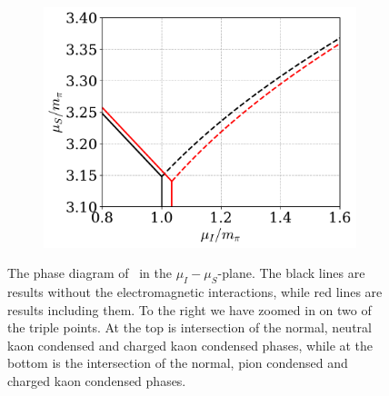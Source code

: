 \begin{figure}[!htb]
\begin{subfigure}{0.49\textwidth}
        \includegraphics[width=\textwidth]{../scripts/figurer/phase_diagram_EM2.pdf}
    \end{subfigure}
    \caption{
        The phase diagram of \chpt\ in the $\mu_I-\mu_S$-plane.
        The black lines are results without the electromagnetic interactions, while red lines are results including them. 
        To the right we have zoomed in on two of the triple points.
        At the top is intersection of the normal, neutral kaon condensed and charged kaon condensed phases, while at the bottom is the intersection of the normal, pion condensed and charged kaon condensed phases.
        }
    \label{fig: phase diagram EM}
\end{figure}




